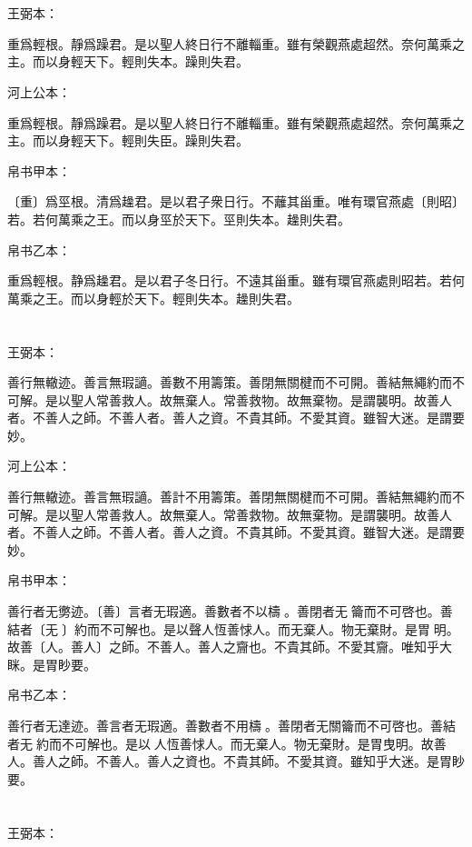 \documentclass[a5paper]{ctexbook}
\begin{document}
    \chapter{}
    王弼本：

    重爲輕根。靜爲躁君。是以聖人終日行不離輜重。雖有榮觀燕處超然。奈何萬乘之主。而以身輕天下。輕則失本。躁則失君。

    河上公本：

    重爲輕根。靜爲躁君。是以聖人終日行不離輜重。雖有榮觀燕處超然。奈何萬乘之主。而以身輕天下。輕則失臣。躁則失君。

    帛书甲本：

    〔重〕爲巠根。清爲趮君。是以君子衆日行。不蘺其甾重。唯有環官燕處〔則昭〕若。若何萬乘之王。而以身巠於天下。巠則失本。趮則失君。

    帛书乙本：

    重爲輕根。静爲趮君。是以君子冬日行。不遠其甾重。雖有環官燕處則昭若。若何萬乘之王。而以身輕於天下。輕則失本。趮則失君。

    \chapter{}
    王弼本：

    善行無轍迹。善言無瑕讁。善數不用籌策。善閉無關楗而不可開。善結無繩約而不可解。是以聖人常善救人。故無棄人。常善救物。故無棄物。是謂襲明。故善人者。不善人之師。不善人者。善人之資。不貴其師。不愛其資。雖智大迷。是謂要妙。

    河上公本：

    善行無轍迹。善言無瑕讁。善計不用籌策。善閉無關楗而不可開。善結無繩約而不可解。是以聖人常善救人。故無棄人。常善救物。故無棄物。是謂襲明。故善人者。不善人之師。不善人者。善人之資。不貴其師。不愛其資。雖智大迷。是謂要妙。

    帛书甲本：

    善行者无勶迹。〔善〕言者无瑕適。善數者不以檮𥮥。善閉者无󱁥籥而不可啓也。善結者〔无𦄿〕約而不可解也。是以聲人恆善㤹人。而无棄人。物无棄財。是胃𢘽明。故善〔人。善人〕之師。不善人。善人之齎也。不貴其師。不愛其齎。唯知乎大眯。是胃眇要。

    帛书乙本：

    善行者无達迹。善言者无瑕適。善數者不用檮󱁦。善閉者无關籥而不可啓也。善結者无𦄿約而不可解也。是以𦔻人恆善㤹人。而无棄人。物无棄財。是胃曳明。故善人。善人之師。不善人。善人之資也。不貴其師。不愛其資。雖知乎大迷。是胃眇要。

    \chapter{}
    王弼本：
\end{document}
